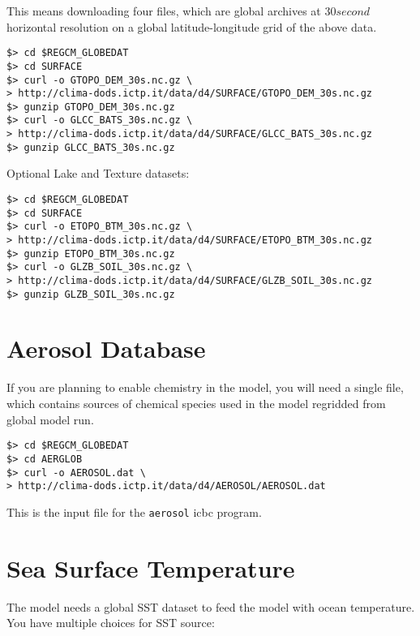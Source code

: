 This means downloading four files, which are global archives at $30 second$
horizontal resolution on a global latitude-longitude grid of the above data.

\begin{Verbatim}
$> cd $REGCM_GLOBEDAT
$> cd SURFACE
$> curl -o GTOPO_DEM_30s.nc.gz \
> http://clima-dods.ictp.it/data/d4/SURFACE/GTOPO_DEM_30s.nc.gz
$> gunzip GTOPO_DEM_30s.nc.gz
$> curl -o GLCC_BATS_30s.nc.gz \
> http://clima-dods.ictp.it/data/d4/SURFACE/GLCC_BATS_30s.nc.gz
$> gunzip GLCC_BATS_30s.nc.gz
\end{Verbatim}

Optional Lake and Texture datasets:

\begin{Verbatim}
$> cd $REGCM_GLOBEDAT
$> cd SURFACE
$> curl -o ETOPO_BTM_30s.nc.gz \
> http://clima-dods.ictp.it/data/d4/SURFACE/ETOPO_BTM_30s.nc.gz
$> gunzip ETOPO_BTM_30s.nc.gz
$> curl -o GLZB_SOIL_30s.nc.gz \
> http://clima-dods.ictp.it/data/d4/SURFACE/GLZB_SOIL_30s.nc.gz
$> gunzip GLZB_SOIL_30s.nc.gz
\end{Verbatim}

\section{Aerosol Database}

If you are planning to enable chemistry in the model, you will need a single
file, which contains sources of chemical species used in the model regridded
from global model run.

\begin{Verbatim}
$> cd $REGCM_GLOBEDAT
$> cd AERGLOB
$> curl -o AEROSOL.dat \
> http://clima-dods.ictp.it/data/d4/AEROSOL/AEROSOL.dat
\end{Verbatim}

This is the input file for the \verb=aerosol= icbc program.

\section{Sea Surface Temperature}

The model needs a global SST dataset to feed the model with ocean temperature.
You have multiple choices for SST source:

